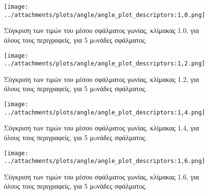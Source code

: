  \begin{figure}[ht!]
\begin{minipage}[b]{1.0\linewidth}
\centering
\texttt{[image: ../attachments/plots/angle/angle\_plot\_descriptors:1,0.png]}
\caption{Σύγκριση των τιμών του μέσου σφάλματος γωνίας, κλίμακας 1.0, για όλους τους περιγραφείς, για 5 μoνάδες σφάλματος.}
\label{fig:plot_scale_des_1.0_high}
\end{minipage}
 \end{figure} 
 \begin{figure}[ht!]
\begin{minipage}[b]{1.0\linewidth}
\centering
\texttt{[image: ../attachments/plots/angle/angle\_plot\_descriptors:1,2.png]}
\caption{Σύγκριση των τιμών του μέσου σφάλματος γωνίας, κλίμακας 1.2, για όλους τους περιγραφείς, για 5 μoνάδες σφάλματος.}
\label{fig:plot_scale_des_1.0_high}
\end{minipage}

 \end{figure} 
 
 \newpage
 
 
 \begin{figure}[ht!]
\begin{minipage}[b]{1.0\linewidth}
\centering
\texttt{[image: ../attachments/plots/angle/angle\_plot\_descriptors:1,4.png]}
\caption{Σύγκριση των τιμών του μέσου σφάλματος γωνίας, κλίμακας 1.4, για όλους τους περιγραφείς, για 5 μoνάδες σφάλματος.}
\label{fig:plot_scale_des_1.4_high}
\end{minipage}
 \end{figure} 
 \begin{figure}[ht!]
\begin{minipage}[b]{1.0\linewidth}
\centering
\texttt{[image: ../attachments/plots/angle/angle\_plot\_descriptors:1,6.png]}
\caption{Σύγκριση των τιμών του μέσου σφάλματος γωνίας, κλίμακας 1.6, για όλους τους περιγραφείς, για 5 μoνάδες σφάλματος.}
\label{fig:plot_scale_des_1.6_high}
\end{minipage}

 \end{figure} 
 
 \newpage 
 
